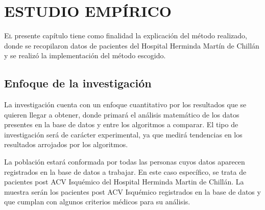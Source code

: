 \doublespacing
\chapter{ESTUDIO EMPÍRICO}

\lettrine[lines=4, slope=0.2em, findent=0.2em, nindent=0.6em]{E}
l presente capítulo tiene como finalidad la explicación del método realizado, donde se recopilaron datos de pacientes del Hospital Herminda Martín de Chillán y se realizó la implementación del método escogido.\\


\doublespacing
\section{Enfoque de la investigación}
La investigación cuenta con un enfoque cuantitativo por los resultados que se quieren llegar a obtener, donde primará el análisis matemático de los datos presentes en la base de datos y entre los algoritmos a comparar. El tipo de investigación será de carácter experimental, ya que medirá tendencias en los resultados arrojados por los algoritmos.\\
\par La población estará conformada por todas las personas cuyos datos aparecen registrados en la base de datos a trabajar. En este caso específico, se trata de pacientes post ACV Isquémico del Hospital Herminda Martin de Chillán. La muestra serán los pacientes post ACV Isquémico registrados en la base de datos y que cumplan con algunos criterios médicos para su análisis.\\


\doublespacing
